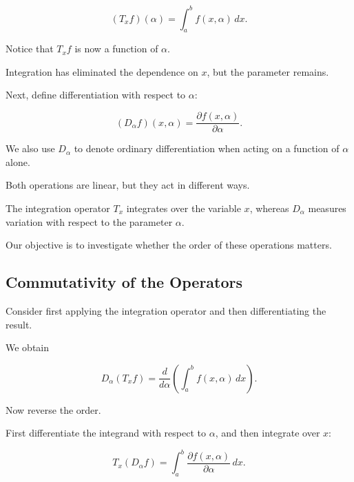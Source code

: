 \documentclass[11pt,a4paper]{article}
\theoremstyle{definition}
\theoremstyle{remark}
\begin{document}
\begin{equation}
    (T_xf)(\alpha)
    =
    \int_a^b f(x,\alpha)\,dx.
    \label{eq:operator_T}
\end{equation}

Notice that $T_xf$ is
now a function of $\alpha$.

Integration has eliminated
the dependence on $x$,
but the parameter remains.

Next, define differentiation
with respect to $\alpha$:

\begin{equation}
    (D_\alpha f)(x,\alpha)
    =
    \frac{\partial f(x,\alpha)}
         {\partial\alpha}.
    \label{eq:operator_D}
\end{equation}

We also use $D_\alpha$
to denote ordinary
differentiation when
acting on a function
of $\alpha$ alone.

Both operations are linear,
but they act in different
ways.

The integration operator
$T_x$ integrates over
the variable $x$,
whereas $D_\alpha$
measures variation with
respect to the parameter
$\alpha$.

Our objective is to
investigate whether
the order of these
operations matters.

\subsection{Commutativity of the Operators}

Consider first applying
the integration operator
and then differentiating
the result.

We obtain

\begin{equation}
    D_\alpha(T_xf)
    =
    \frac{d}{d\alpha}
    \left(
    \int_a^b f(x,\alpha)\,dx
    \right).
    \label{eq:operator_DT}
\end{equation}

Now reverse the order.

First differentiate the
integrand with respect
to $\alpha$, and then
integrate over $x$:

\begin{equation}
    T_x(D_\alpha f)
    =
    \int_a^b
    \frac{\partial f(x,\alpha)}
         {\partial\alpha}\,dx.
    \label{eq:operator_TD}
\end{equation}
\end{document}
